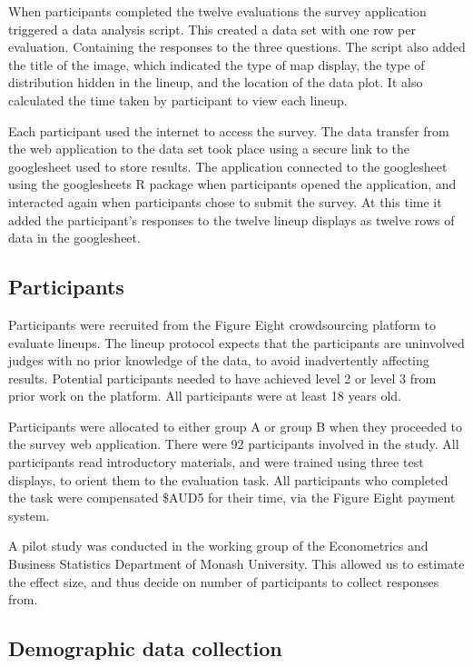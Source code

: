 \documentclass{monashthesis}
\begin{document}
When participants completed the twelve evaluations the survey application triggered a data analysis script. This created a data set with one row per evaluation. Containing the responses to the three questions. The script also added the title of the image, which indicated the type of map display, the type of distribution hidden in the lineup, and the location of the data plot. It also calculated the time taken by participant to view each lineup.

Each participant used the internet to access the survey.
The data transfer from the web application to the data set took place using a secure link to the googlesheet used to store results. The application connected to the googlesheet using the googlesheets \autocite{sheets} R package when participants opened the application, and interacted again when participants chose to submit the survey. At this time it added the participant's responses to the twelve lineup displays as twelve rows of data in the googlesheet.

\hypertarget{participants}{%
\subsection{Participants}\label{participants}}

Participants were recruited from the Figure Eight crowdsourcing platform \autocite{figeight} to evaluate lineups.
The lineup protocol expects that the participants are uninvolved judges with no prior knowledge of the data, to avoid inadvertently affecting results. Potential participants needed to have achieved level 2 or level 3 from prior work on the platform. All participants were at least 18 years old.

Participants were allocated to either group A or group B when they proceeded to the survey web application. There were 92 participants involved in the study. All participants read introductory materials, and were trained using three test displays, to orient them to the evaluation task. All participants who completed the task were compensated \$AUD5 for their time, via the Figure Eight payment system.

A pilot study was conducted in the working group of the Econometrics and Business Statistics Department of Monash University. This allowed us to estimate the effect size, and thus decide on number of participants to collect responses from.

\hypertarget{demographic-data-collection}{%
\subsection{Demographic data collection}\label{demographic-data-collection}}
\end{document}
